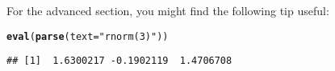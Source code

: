 \documentclass[11pt]{article}\usepackage[]{graphicx}\usepackage[]{color}
\makeatletter
\newcommand{\hlstr}[1]{\textcolor[rgb]{0.192,0.494,0.8}{#1}}%
\newcommand{\hlstd}[1]{\textcolor[rgb]{0.345,0.345,0.345}{#1}}%
\newcommand{\hlkwc}[1]{\textcolor[rgb]{0.333,0.667,0.333}{#1}}%
\newcommand{\hlkwd}[1]{\textcolor[rgb]{0.737,0.353,0.396}{\textbf{#1}}}%
\newenvironment{kframe}{%
 \def\at@end@of@kframe{}%
 \ifinner\ifhmode%
  \def\at@end@of@kframe{\end{minipage}}%
  \begin{minipage}{\columnwidth}%
 \fi\fi%
 \def\FrameCommand##1{\hskip\@totalleftmargin \hskip-\fboxsep
 \colorbox{shadecolor}{##1}\hskip-\fboxsep
     \hskip-\linewidth \hskip-\@totalleftmargin \hskip\columnwidth}%
 \MakeFramed {\advance\hsize-\width
   \@totalleftmargin\z@ \linewidth\hsize
   \@setminipage}}%
 {\par\unskip\endMakeFramed%
 \at@end@of@kframe}
\newenvironment{knitrout}{}{} %
\makeatother
\begin{document}
For the advanced section, you might find the following tip useful:

\begin{knitrout}
\color{fgcolor}\begin{kframe}
\begin{alltt}
\hlkwd{eval}\hlstd{(}\hlkwd{parse}\hlstd{(}\hlkwc{text}\hlstd{=}\hlstr{"rnorm(3)"}\hlstd{))}
\end{alltt}
\begin{verbatim}
## [1]  1.6300217 -0.1902119  1.4706708
\end{verbatim}
\end{kframe}
\end{knitrout}
\end{document}
